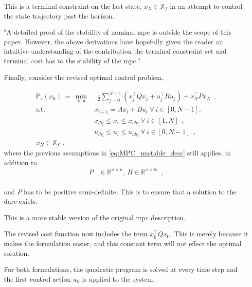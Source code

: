 This is a terminal constraint on the last state, $x_N \in \mathbb{X}_f$ in an attempt to control the state trajectory past the horizon. 

"A detailed proof of the stability of nominal \acrshort{mpc} is outside the scope of this paper. However, the above derivations have hopefully given the reader an intuitive understanding of the contribution the terminal constraint set and terminal cost has to the stability of the \acrshort{mpc}."
    
Finally, consider the revised optimal control problem,

\begin{equation}\label{eq:MPC_stable}
    \begin{split}
        \mathbb{P}_s(x_0) \: = \: \min_{\bm x, \bm u}& \: \: \frac{1}{2} \sum_{j=0}^{{N-1}}(x_{j}^\top Q x_{j} + u_{j}^\top R u_j) + x_N^\top P x_N \: \: , \\
        \text{s.t. }    & x_{i+1} = Ax_i + Bu_i \: \forall \: i \in [0, N-1],\\
                        &  {x_{lb}}_i \leq x_i \leq  {x_{ub}}_i \: \forall \: i \in [1, N]  \: \: , \\
                        &  {u_{lb}}_i \leq u_i \leq  {u_{ub}}_i \: \forall \: i \in [0, N-1]    \: \: , \\
                        x_N \in \mathbb{X}_f \: \: ,
    \end{split}
\end{equation}
where the previous assumptions in \eqref{eq:MPC_unstable_desc} still applies, in addition to 
\begin{equation}\label{eq:MPC_stable_desc}
    \begin{split}
       P &\in \mathbb{R}^{n\times n}, \: B \in \mathbb{R}^{n\times m} \: \: , \\
    \end{split}        
\end{equation}

and $P$ has to be positive semi-definite. This is to ensure that a solution to the \acrlong{dare} exists.

This is a more stable version of the original \acrshort{mpc} description.
    
The revised cost function now includes the term $x_0^\top Q x_0$. This is merely because it makes the formulation easier, and this constant term will not effect the optimal solution.

For both formulations, the quadratic program is solved at every time step and the first control action $u_0$ is applied to the system.

